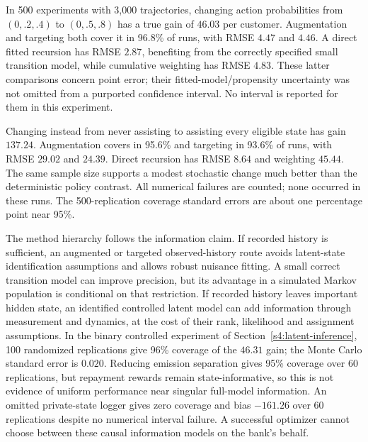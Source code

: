 In 500 experiments with 3,000 trajectories, changing action probabilities
from $(0,.2,.4)$ to $(0,.5,.8)$ has a true gain of $46.03$ per customer.
Augmentation and targeting both cover it in 96.8\% of runs, with RMSE
$4.47$ and $4.46$. A direct fitted recursion has RMSE $2.87$, benefiting
from the correctly specified small transition model, while cumulative
weighting has RMSE $4.83$. These latter comparisons concern point error;
their fitted-model/propensity uncertainty was not omitted from a purported
confidence interval. No interval is reported for them in this experiment.

Changing instead from never assisting to assisting every eligible state
has gain $137.24$. Augmentation covers in 95.6\% and targeting in 93.6\%
of runs, with RMSE $29.02$ and $24.39$. Direct recursion has RMSE $8.64$
and weighting $45.44$. The same sample size supports a modest stochastic
change much better than the deterministic policy contrast. All numerical
failures are counted; none occurred in these runs. The 500-replication
coverage standard errors are about one percentage point near 95\%.

The method hierarchy follows the information claim. If recorded history
is sufficient, an augmented or targeted observed-history route avoids
latent-state identification assumptions and allows robust nuisance fitting.
A small correct transition model can improve precision, but its advantage
in a simulated Markov population is conditional on that restriction.
If recorded history leaves important hidden state, an identified controlled
latent model can add information through measurement and dynamics, at the
cost of their rank, likelihood and assignment assumptions. In the binary
controlled experiment of Section~\ref{s4:latent-inference}, 100 randomized
replications give 96\% coverage of the $46.31$ gain; the Monte Carlo
standard error is $0.020$. Reducing emission separation gives 95\% coverage
over 60 replications, but repayment rewards remain state-informative, so
this is not evidence of uniform performance near singular full-model
information. An omitted private-state logger gives zero coverage and
bias $-161.26$ over 60 replications despite no numerical interval failure.
A successful optimizer cannot choose between these causal information
models on the bank's behalf.



